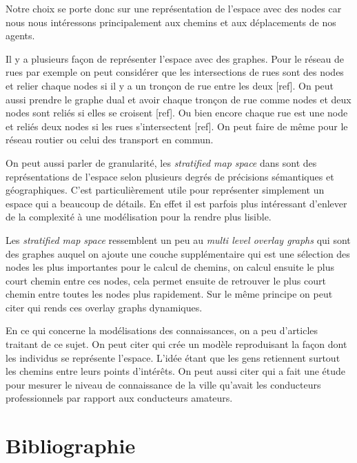 \documentclass[a4paper]{article}
\begin{document}
Notre choix se porte donc sur une représentation de l'espace avec des nodes car
nous nous intéressons principalement aux chemins et aux déplacements de nos
agents.

Il y a plusieurs façon de représenter l'espace avec des graphes. Pour le réseau
de rues par exemple on peut considérer que les intersections de rues sont des
nodes et relier chaque nodes si il y a un tronçon de rue entre les deux [ref].
On peut aussi prendre le graphe dual et avoir chaque tronçon de rue comme nodes
et deux nodes sont reliés si elles se croisent [ref]. Ou bien encore chaque rue
est une node et reliés deux nodes si les rues s'intersectent [ref]. On peut
faire de même pour le réseau routier ou celui des transport en commun.

On peut aussi parler de granularité, les \emph{stratified map space} dans
\cite{stell1998} sont des représentations de l'espace selon plusieurs degrés de
précisions sémantiques et géographiques. C'est particulièrement utile pour
représenter simplement un espace qui a beaucoup de détails. En effet il est
parfois plus intéressant d'enlever de la complexité à une modélisation pour la
rendre plus lisible.

Les \emph{stratified map space} ressemblent un peu au \emph{multi level overlay
graphs}\cite{holzer2009} qui sont des graphes auquel on ajoute une couche supplémentaire
qui est une sélection des nodes les plus importantes pour le calcul de chemins,
on calcul ensuite le plus court chemin entre ces nodes, cela permet ensuite de
retrouver le plus court chemin entre toutes les nodes plus rapidement. Sur le
même principe on peut citer \cite{bruera2008} qui rends ces overlay graphs
dynamiques.

En ce qui concerne la modélisations des connaissances, on a peu d'articles
traitant de ce sujet. On peut citer \cite{kuipers1978} qui crée un modèle
reproduisant la façon dont les individus se représente l'espace. L'idée étant
que les gens retiennent surtout les chemins entre leurs points d'intérêts. On
peut aussi citer \cite{stern1988} qui a fait une étude pour mesurer le niveau de
connaissance de la ville qu'avait les conducteurs professionnels par rapport
aux conducteurs amateurs.

\section{Bibliographie}


\end{document}
